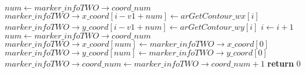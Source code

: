 \begin{algorithm}[ht]
\begin{algorithmic}[1]
		\State $num \gets \mathit{marker\_infoTWO \to coord\_num}$
		\State $\mathit{marker\_infoTWO \to x\_coord}\left[i - \mathit{v1} + num\right] \gets
		 \mathit{arGetContour\_wx}[i]$
		\State $\mathit{marker\_infoTWO \to y\_coord}\left[i - \mathit{v1} + num\right] \gets
		 \mathit{arGetContour\_wy}[i]$
		\State $i \gets i + 1$
	\EndFor
	\label{alg:argetcontour-3-merge-end}
	\State $num \gets \mathit{marker\_infoTWO \to coord\_num}$
	\label{alg:argetcontour-3-savev1-start}
	\State $\mathit{marker\_infoTWO \to x\_coord}[num] \gets \mathit{marker\_infoTWO \to x\_coord}[0]$
	\State $\mathit{marker\_infoTWO \to y\_coord}[num] \gets \mathit{marker\_infoTWO \to y\_coord}[0]$
	\label{alg:argetcontour-3-savev1-end}
	\State $\mathit{marker\_infoTWO \to coord\_num} \gets \mathit{marker\_infoTWO \to coord\_num} + 1$
	\label{alg:argetcontour-3-inccoordnum}
	\State \textbf{return} $0$
\end{algorithmic}
\end{algorithm}
